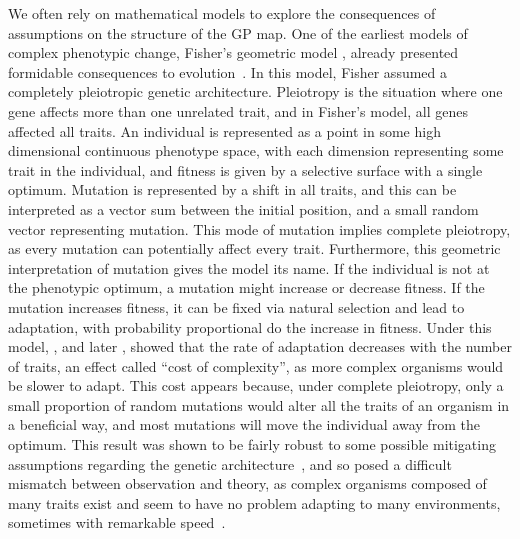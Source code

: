 \begin{refsection}
We often rely on mathematical models to explore the consequences of
assumptions on the structure of the GP map. One of the earliest models
of complex phenotypic change, Fisher's geometric model
\parencite{Fisher1930-bp}, already presented formidable consequences to
evolution~\parencite{Orr2000-gn}. In this model, Fisher assumed a completely
pleiotropic genetic architecture. Pleiotropy is the situation where one gene affects more than one
unrelated trait, and in Fisher's model, all genes affected all traits.
An individual is represented as a point in some high dimensional
continuous phenotype space, with each dimension representing some trait
in the individual, and fitness is given by a selective surface with a
single optimum. Mutation is represented by a shift in all traits, and
this can be interpreted as a vector sum between the initial position,
and a small random vector representing mutation. This mode of mutation
implies complete pleiotropy, as every mutation can potentially affect
every trait. Furthermore, this geometric interpretation of mutation
gives the model its name. If the individual is not at the phenotypic
optimum, a mutation might increase or decrease fitness. If the mutation
increases fitness, it can be fixed via natural selection and lead to
adaptation, with probability proportional do the increase in fitness.
Under this model, \textcite{Kimura1983-qs}, and later 
\textcite{Orr2000-gn}, showed that the rate of adaptation decreases with
the number of traits, an effect called ``cost of complexity'', as more complex organisms would be
slower to adapt. This cost appears because, under complete pleiotropy,
only a small proportion of random mutations would alter all the traits
of an organism in a beneficial way, and most mutations will move the
individual away from the optimum. This result was shown to be fairly
robust to some possible mitigating assumptions regarding the genetic
architecture~\parencite{Welch2003-mh}, and so posed a difficult mismatch
between observation and theory, as complex organisms composed of many
traits exist and seem to have no problem adapting to many environments,
sometimes with remarkable speed~\parencite{Kinnison2001-lu}.


\end{refsection}
